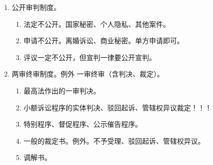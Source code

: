 \begin{enumerate}
\begin{enumerate}
\begin{enumerate}
                  \item 被申请人暂停工作到决定作出前，采取紧急措施的除外。
                  \item 换人程序不需要重来。
                  \item 被驳回 \yjt 申请人可以复议一次。期间不停止原决定的执行。
                  \item 新事实新情况，可以再次申请回避，重走程序。
                \end{enumerate}
        \end{enumerate}
  \item 公开审判制度。
        \begin{enumerate}
          \item 法定不公开。国家秘密、个人隐私、其他案件。
          \item 申请不公开。离婚诉讼、商业秘密。单方申请即可。
          \item 评议一定不公开，但宣判一律要公开宣判。
        \end{enumerate}
  \item 两审终审制度。例外 \yjt 一审终审（含判决、裁定）。
        \begin{enumerate}
          \item 最高法作出的一审判决。
          \item 小额诉讼程序的实体判决、驳回起诉、管辖权异议裁定！！！
          \item 特别程序、督促程序、公示催告程序。
          \item 一般的裁定书。例外。不予受理、驳回起诉、管辖权异议。
          \item 调解书。
        \end{enumerate}
\end{enumerate}

